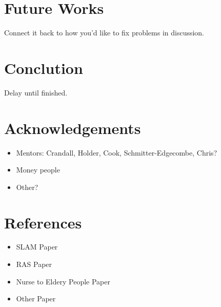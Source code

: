 \documentclass[11pt, conference, a4paper]{IEEEtran}
\begin{document}
\section{Future Works}
Connect it back to how you'd like to fix problems in discussion.


\section{Conclution}
Delay until finished.


\section{Acknowledgements}
\begin{itemize}
    \item Mentors: Crandall, Holder, Cook, Schmitter-Edgecombe, Chris?
    \item Money people
    \item Other?
\end{itemize}


\section{References}
\begin{itemize}
    \item SLAM Paper
    \item RAS Paper
    \item Nurse to Eldery People Paper
    \item Other Paper
\end{itemize}
\end{document}
